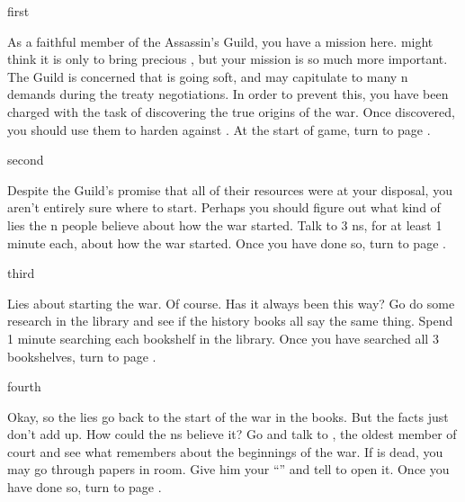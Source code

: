 \documentclass[greennotebook]{NeptuneBall}
\begin{document}
\startnotebook{\nWar{}}

\begin{page}{first}

As a faithful member of the Assassin's Guild, you have a mission here. \cManta{} might think it is only to bring \cManta{\them} \cManta{\their} precious \iHemlock{}, but your mission is so much more important. The Guild is concerned that \cPrince{} is going soft, and may capitulate to many \pAtlantis{}n demands during the treaty negotiations. In order to prevent this, you have been charged with the task of discovering the true origins of the war. Once discovered, you should use them to harden \cPrince{} against \pAtlantis{}. At the start of game, turn to page .

\end{page}

\begin{page}{second}

Despite the Guild's promise that all of their resources were at your disposal, you aren't entirely sure where to start. Perhaps you should figure out what kind of lies the \pAtlantis{}n people believe about how the war started. Talk to 3 \pAtlantis{}ns, for at least 1 minute each, about how the war started. Once you have done so, turn to page .

\end{page}

\begin{page}{third}

Lies about \pPacifica{} starting the war. Of course. Has it always been this way? Go do some research in the library and see if the history books all say the same thing. Spend 1 minute searching each bookshelf in the library. Once you have searched all 3 bookshelves, turn to page .

\end{page}

\begin{page}{fourth}

Okay, so the lies go back to the start of the war in the books. But the facts just don't add up. How could the \pAtlantis{}ns believe it? Go and talk to \cManta{}, the oldest member of court and see what \cManta{\they} remembers about the beginnings of the war. If \cManta{} is dead, you may go through \cManta{\their} papers in \cManta{\their} room. Give him your ``\mWPacket{\MYname}'' and tell \cManta{\them} to open it. Once you have done so, turn to page .

\end{page}
\end{document}
